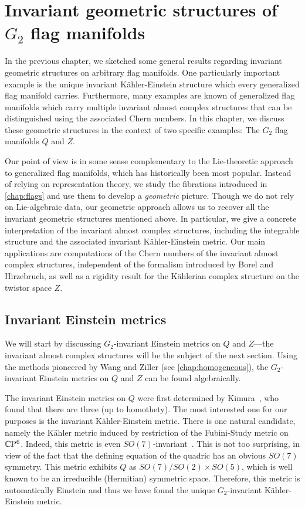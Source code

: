 \chapter{Invariant geometric structures of \texorpdfstring{$G_2$}{G2} flag manifolds}
\label{chap:invarstructures}

In the previous chapter, we sketched some general results regarding invariant geometric structures on arbitrary flag manifolds. One particularly important example is the unique invariant K\"ahler-Einstein structure which every generalized flag manifold carries. Furthermore, many examples are known of generalized flag manifolds which carry multiple invariant almost complex structures that can be distinguished using the associated Chern numbers. In this chapter, we discuss these geometric structures in the context of two specific examples: The $G_2$ flag manifolds $Q$ and $Z$.

Our point of view is in some sense complementary to the Lie-theoretic approach to generalized flag manifolds, which has historically been most popular. Instead of relying on representation theory, we study the fibrations introduced in \cref{chap:flags} and use them to develop a \emph{geometric} picture. Though we do not rely on Lie-algebraic data, our geometric approach allows us to recover all the invariant geometric structures mentioned above. In particular, we give a concrete interpretation of the invariant almost complex structures, including the integrable structure and the associated invariant K\"ahler-Einstein metric. Our main applications are computations of the Chern numbers of the invariant almost complex structures, independent of the formalism introduced by Borel and Hirzebruch, as well as a rigidity result for the K\"ahlerian complex structure on the twistor space $Z$.

\section{Invariant Einstein metrics}

We will start by discussing $G_2$-invariant Einstein metrics on $Q$ and $Z$---the invariant almost complex structures will be the subject of the next section. Using the methods pioneered by Wang and Ziller (see \cref{chap:homogeneous}), the $G_2$-invariant Einstein metrics on $Q$ and $Z$ can be found algebraically.

The invariant Einstein metrics on $Q$ were first determined by Kimura~\cite{Kim1990}, who found that there are three (up to homothety). The most interested one for our purposes is the invariant K\"ahler-Einstein metric. There is one natural candidate, namely the K\"ahler metric induced by restriction of the Fubini-Study metric on $\mathbb{C}\mathrm{P}^6$. Indeed, this metric is even $SO(7)$-invariant~\cite{Smy1967}. This is not too surprising, in view of the fact that the defining equation of the quadric has an obvious $SO(7)$ symmetry. This metric exhibits $Q$ as $SO(7)/SO(2)\times SO(5)$, which is well known to be an irreducible (Hermitian) symmetric space. Therefore, this metric is automatically Einstein and thus we have found the unique $G_2$-invariant K\"ahler-Einstein metric.

